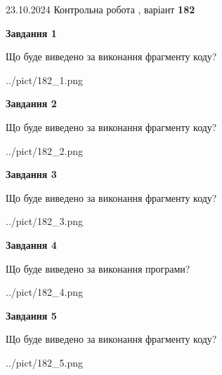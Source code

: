 \documentclass[12pt, ukrainian]{article}
\begin{document}
{\Large{23.10.2024 Контрольна робота , варіант  \No \textbf { 182 }\par}}
{
\begin {large}
{\begin {center}\textbf{Завдання 1}\end {center}}

Що буде виведено за виконання фрагменту коду?\par
\begin{center}
	{../pict/182_1.png}
\end{center}
\newpage

{\begin {center}\textbf{Завдання 2}\end {center}}

Що буде виведено за виконання фрагменту коду?\par
\begin{center}
	{../pict/182_2.png}
\end{center}
\newpage

{\begin {center}\textbf{Завдання 3}\end {center}}

Що буде виведено за виконання фрагменту коду?\par
\begin{center}
	{../pict/182_3.png}
\end{center}
\newpage

{\begin {center}\textbf{Завдання 4}\end {center}}

Що буде виведено за виконання програми?\par
\begin{center}
	{../pict/182_4.png}
\end{center}
\newpage

{\begin {center}\textbf{Завдання 5}\end {center}}

Що буде виведено за виконання фрагменту коду?\par
\begin{center}
	{../pict/182_5.png}
\end{center}
\newpage


\end{large}}
\end{document}
